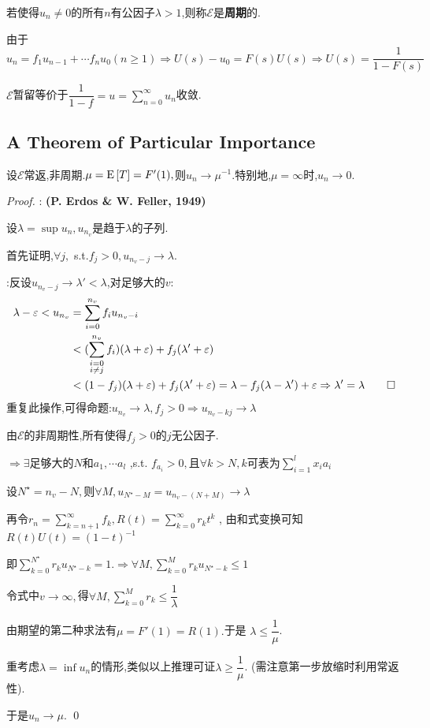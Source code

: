 若使得$ u_n\neq 0$的所有$ n$有公因子$ \lambda >1$,则称$ \mathcal{E}$是\textbf{周期}的.

由于 $ u_n = f_1u_{n-1}+\cdots f_nu_0 (n\ge 1)\Rightarrow U(s)-u_0 = F(s)U(s)\Rightarrow U(s)=\dfrac{1}{1-F(s)}$

$ \mathcal{E}$暂留等价于$ \dfrac{1}{1-f} = u=\sum_{n=0}^\infty u_n$收敛.


\subsection{A Theorem of Particular Importance}
  设$ \mathcal{E}$常返,非周期.$ \mu = \text{E}\left[T\right] = F'(1),$则$ u_n\to \mu^{-1}$.特别地,$ \mu=\infty$时,$ u_n\to 0$.

\begin{proof}:
  \textbf{(P. Erdos \& W. Feller, 1949)}

  设$\lambda=\sup u_n,u_{n_v}$是趋于$ \lambda$的子列.

  首先证明,$ \forall j, $ s.t.$ f_j>0,u_{n_v-j}\to \lambda$.

  \proof:反设$ u_{n_v-j}\to \lambda'<\lambda$,对足够大的$ v$:
\begin{align*}
  \lambda-\varepsilon < u_{n_v} &=\sum_{i=0}^{n_v}f_iu_{n_v-i}\\
     &<(\sum_{\substack{i=0\\i\neq j}}^{n_v}f_i)(\lambda + \varepsilon) + f_j(\lambda' + \varepsilon)\\
     &<(1-f_j)(\lambda+\varepsilon) + f_j(\lambda' + \varepsilon)
     =\lambda-f_j(\lambda-\lambda') +\varepsilon \Rightarrow \lambda' = \lambda \qed
\end{align*}
重复此操作,可得命题:$u_{n_v}\to \lambda, f_j>0\Rightarrow  u_{n_v-kj}\to \lambda$

由$ \mathcal{E}$的非周期性,所有使得$ f_j>0$的$ j$无公因子.

$\Rightarrow  \exists 足够大的N 和 a_1,\cdots a_l$ ,s.t. $f_{a_i}>0,且 \forall k >N, k 可表为 \sum_{i=1}^l{x_ia_i} $

设$ N^\star = n_v-N,$则$ \forall M, u_{N^\star - M} = u_{n_v - (N+M)}\to \lambda$

再令$ r_n = \sum_{k=n+1}^\infty f_k, R(t) = \sum_{k=0}^{\infty}r_kt^k$ , 由和式变换可知$ R(t)U(t) = (1-t)^{-1}$

即$ \sum_{k=0}^{N^\star}{r_ku_{N^\star - k}} = 1.\Rightarrow  \forall M, \sum_{k=0}^M{r_ku_{N^\star - k}}\le 1$

令式中$v\to \infty , $得$\forall M, \sum_{k=0}^M{r_k} \le \dfrac{1}{\lambda} $

由期望的第二种求法有$ \mu = F'(1) = R(1). $于是 $\lambda \le \dfrac{1}{\mu}$.

重考虑$ \lambda=\inf u_n$的情形,类似以上推理可证$ \lambda \ge \dfrac{1}{\mu}$. (需注意第一步放缩时利用常返性).

于是$ u_n\to \mu$. \qed
\end{proof}

